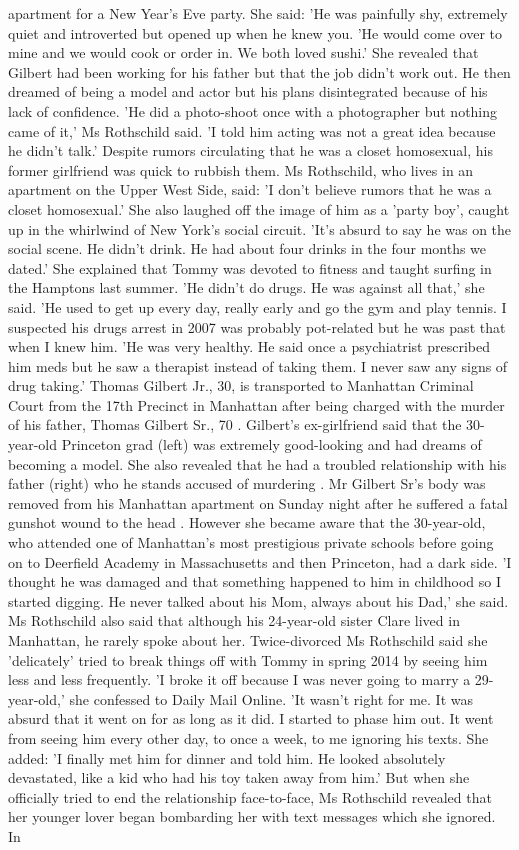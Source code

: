\begin{table}[H]
apartment for a New Year’s Eve party. She said: 'He was painfully shy, extremely quiet and introverted but opened up when he knew you. 'He would come over to mine and we would cook or order in. We both loved sushi.' She revealed that Gilbert had been working for his father but that the job didn't work out. He then dreamed of being a model and actor but his plans disintegrated because of his lack of confidence. 'He did a photo-shoot once with a photographer but nothing came of it,' Ms Rothschild said. 'I told him acting was not a great idea because he didn’t talk.' Despite rumors circulating that he was a closet homosexual, his former girlfriend was quick to rubbish them. Ms Rothschild, who lives in an apartment on the Upper West Side, said: 'I don’t believe rumors that he was a closet homosexual.' She also laughed off the image of him as a 'party boy', caught up in the whirlwind of New York's social circuit. 'It’s absurd to say he was on the social scene. He didn’t drink. He had about four drinks in the four months we dated.' She explained that Tommy was devoted to fitness and taught surfing in the Hamptons last summer. 'He didn’t do drugs. He was against all that,' she said. 'He used to get up every day, really early and go the gym and play tennis. I suspected his drugs arrest in 2007 was probably pot-related but he was past that when I knew him. 'He was very healthy. He said once a psychiatrist prescribed him meds but he saw a therapist instead of taking them. I never saw any signs of drug taking.' Thomas Gilbert Jr., 30, is transported to Manhattan Criminal Court from the 17th Precinct in Manhattan after being charged with the murder of his father, Thomas Gilbert Sr., 70 . Gilbert's ex-girlfriend said that the 30-year-old Princeton grad (left) was extremely good-looking and had dreams of becoming a model. She also revealed that he had a troubled relationship with his father (right) who he stands accused of murdering . Mr Gilbert Sr's body was removed from his Manhattan apartment on Sunday night after he suffered a fatal gunshot wound to the head . However she became aware that the 30-year-old, who attended one of Manhattan's most prestigious private schools before going on to Deerfield Academy in Massachusetts and then Princeton, had a dark side. 'I thought he was damaged and that something happened to him in childhood so I started digging. He never talked about his Mom, always about his Dad,' she said. Ms Rothschild also said that although his 24-year-old sister Clare lived in Manhattan, he rarely spoke about her. Twice-divorced Ms Rothschild said she 'delicately' tried to break things off with Tommy in spring 2014 by seeing him less and less frequently. 'I broke it off because I was never going to marry a 29-year-old,' she confessed to Daily Mail Online. 'It wasn’t right for me. It was absurd that it went on for as long as it did. I started to phase him out. It went from seeing him every other day, to once a week, to me ignoring his texts. She added: 'I finally met him for dinner and told him. He looked absolutely devastated, like a kid who had his toy taken away from him.' But when she officially tried to end the relationship face-to-face, Ms Rothschild revealed that her younger lover began bombarding her with text messages which she ignored. In 
\end{table}
